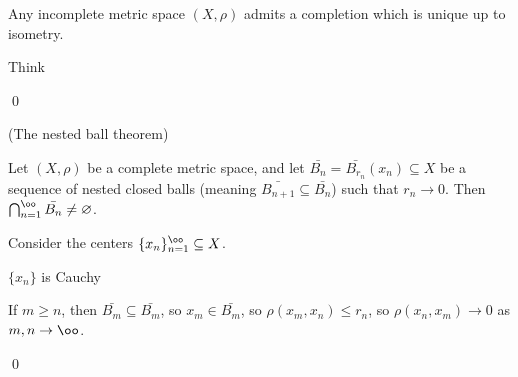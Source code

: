 \documentclass[x11names,reqno,14pt]{extarticle}
\newcommand{\seq}[2][\oo]{_{#2 = 1}^#1}
\newcommand{\bigcapn}[1][\oo]{\bigcap\seq[#1]{n}}
\begin{document}
\thm 

Any incomplete metric space $(X,\rho)$ admits a completion which is unique up to isometry. 

\proof

Think

\qed

\thm (The nested ball theorem)

Let $(X,\rho)$ be a complete metric space, and let $\bar{B_n} = \bar{B_{r_n}}(x_n) \subseteq X$ be a sequence of nested closed balls (meaning $\bar{B_{n + 1}} \subseteq \bar{B_n}$) such that $r_n\to0$. Then $\bigcapn \bar{B_n} \neq \varnothing$. 

\proof

Consider the centers $\{x_n\}\seq{n} \subseteq X$. 

\claim $\{x_n\}$ is Cauchy

\proof

If $m \geq n$, then $\bar{B_m} \subseteq \bar{B_m}$, so $x_m \in \bar{B_m}$, so $\rho(x_m, x_n) \leq r_n$, so $\rho(x_n,x_m)\to0$ as $m,n\to\oo$.

\qed
\end{document}
